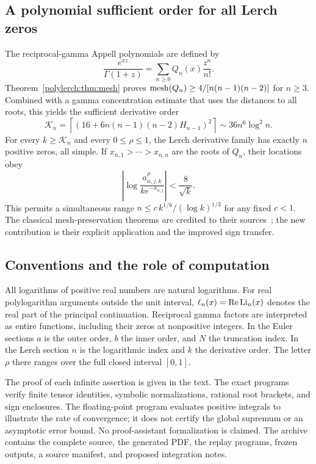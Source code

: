 \subsection{A polynomial sufficient order for all Lerch zeros}

The reciprocal-gamma Appell polynomials are defined by
\[
 \frac{e^{xz}}{\Gamma(1+z)}
   =\sum_{n\ge0}Q_n(x)\frac{z^n}{n!}.
\]
Theorem~\ref{polylerch:thm:mesh} proves
$\operatorname{mesh}(Q_n)\ge4/[n(n-1)(n-2)]$ for $n\ge3$.
Combined with a gamma concentration estimate that uses the distances
to all roots, this yields the sufficient derivative order
\[
 \mathcal K_n=
 \left\lceil
 \left(16+6n(n-1)(n-2)H_{n-1}\right)^2
 \right\rceil
 \sim36n^6\log^2 n.
\]
For every $k\ge\mathcal K_n$ and every $0\le\rho\le1$, the Lerch
derivative family has exactly $n$ positive zeros, all simple. If
$x_{n,1}>\cdots>x_{n,n}$ are the roots of $Q_n$, their locations obey
\[
 \left|\log\frac{a_{n,j,k}^{\rho}}{ke^{-x_{n,j}}}\right|
 <\frac8{\sqrt k}.
\]
This permits a simultaneous range
$n\le c\,k^{1/6}/(\log k)^{1/3}$ for any fixed $c<1$.
The classical mesh-preservation theorems are credited to their
sources~\cite{polylerch:KSV}; the new contribution is their explicit
application and the improved sign transfer.

\subsection{Conventions and the role of computation}

All logarithms of positive real numbers are natural logarithms.
For real polylogarithm arguments outside the unit interval,
$\ell_n(x)=\operatorname{Re}\operatorname{Li}_n(x)$ denotes the real part of the principal
continuation. Reciprocal gamma factors are interpreted as entire
functions, including their zeros at nonpositive integers.
In the Euler sections $a$ is the outer order, $b$ the inner order,
and $N$ the truncation index. In the Lerch section $n$ is the
logarithmic index and $k$ the derivative order. The letter $\rho$
there ranges over the full closed interval $[0,1]$.

The proof of each infinite assertion is given in the text. The exact
programs verify finite tensor identities, symbolic normalizations,
rational root brackets, and sign enclosures. The floating-point
program evaluates positive integrals to illustrate the rate of
convergence; it does not certify the global supremum or an asymptotic
error bound. No proof-assistant formalization is claimed. The archive
contains the complete source, the generated PDF, the replay programs,
frozen outputs, a source manifest, and proposed integration notes.
